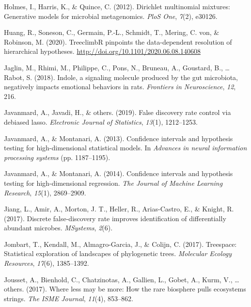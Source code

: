 \documentclass[12pt,a4paper]{reedthesis}
\theoremstyle{definition}
\theoremstyle{definition}
\theoremstyle{definition}
\theoremstyle{remark}
\begin{document}
\leavevmode\hypertarget{ref-holmes2012dirichlet}{}%
Holmes, I., Harris, K., \& Quince, C. (2012). Dirichlet multinomial mixtures: Generative models for microbial metagenomics. \emph{PloS One}, \emph{7}(2), e30126.

\leavevmode\hypertarget{ref-huang2020treeclimbr}{}%
Huang, R., Soneson, C., Germain, P.-L., Schmidt, T., Mering, C. von, \& Robinson, M. (2020). TreeclimbR pinpoints the data-dependent resolution of hierarchical hypotheses. \url{http://doi.org/10.1101/2020.06.08.140608}

\leavevmode\hypertarget{ref-jaglin2018indole}{}%
Jaglin, M., Rhimi, M., Philippe, C., Pons, N., Bruneau, A., Goustard, B., \ldots{} Rabot, S. (2018). Indole, a signaling molecule produced by the gut microbiota, negatively impacts emotional behaviors in rats. \emph{Frontiers in Neuroscience}, \emph{12}, 216.

\leavevmode\hypertarget{ref-javanmard2019false}{}%
Javanmard, A., Javadi, H., \& others. (2019). False discovery rate control via debiased lasso. \emph{Electronic Journal of Statistics}, \emph{13}(1), 1212--1253.

\leavevmode\hypertarget{ref-javanmard2013confidence}{}%
Javanmard, A., \& Montanari, A. (2013). Confidence intervals and hypothesis testing for high-dimensional statistical models. In \emph{Advances in neural information processing systems} (pp. 1187--1195).

\leavevmode\hypertarget{ref-javanmard2014confidence}{}%
Javanmard, A., \& Montanari, A. (2014). Confidence intervals and hypothesis testing for high-dimensional regression. \emph{The Journal of Machine Learning Research}, \emph{15}(1), 2869--2909.

\leavevmode\hypertarget{ref-jiang2017discrete}{}%
Jiang, L., Amir, A., Morton, J. T., Heller, R., Arias-Castro, E., \& Knight, R. (2017). Discrete false-discovery rate improves identification of differentially abundant microbes. \emph{MSystems}, \emph{2}(6).

\leavevmode\hypertarget{ref-jombart2017treespace}{}%
Jombart, T., Kendall, M., Almagro-Garcia, J., \& Colijn, C. (2017). Treespace: Statistical exploration of landscapes of phylogenetic trees. \emph{Molecular Ecology Resources}, \emph{17}(6), 1385--1392.

\leavevmode\hypertarget{ref-jousset2017less}{}%
Jousset, A., Bienhold, C., Chatzinotas, A., Gallien, L., Gobet, A., Kurm, V., \ldots{} others. (2017). Where less may be more: How the rare biosphere pulls ecosystems strings. \emph{The ISME Journal}, \emph{11}(4), 853--862.
\end{document}
